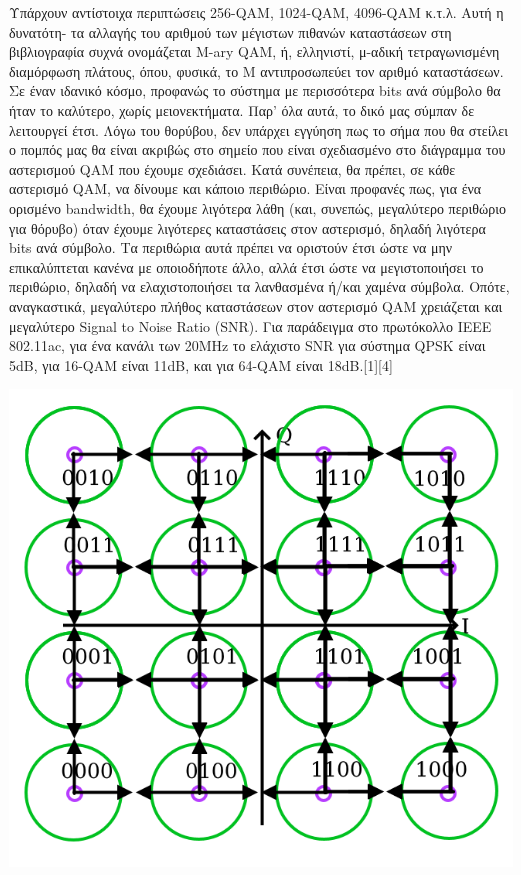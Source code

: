 \documentclass{article}
\begin{document}
Υπάρχουν αντίστοιχα περιπτώσεις 256-QAM, 1024-QAM, 4096-QAM κ.τ.λ. Αυτή η δυνατότη- τα αλλαγής του αριθμού των μέγιστων πιθανών καταστάσεων στη βιβλιογραφία συχνά ονομάζεται M-ary QAM, ή, ελληνιστί, μ-αδική τετραγωνισμένη διαμόρφωση πλάτους, όπου, φυσικά, το Μ αντιπροσωπεύει τον αριθμό καταστάσεων.\\[12pt]
Σε έναν ιδανικό κόσμο, προφανώς το σύστημα με περισσότερα bits ανά σύμβολο θα ήταν το καλύτερο, χωρίς μειονεκτήματα. Παρ' όλα αυτά, το δικό μας σύμπαν δε λειτουργεί έτσι. Λόγω του θορύβου, δεν υπάρχει εγγύηση πως το σήμα που θα στείλει ο πομπός μας θα είναι ακριβώς στο σημείο που είναι σχεδιασμένο στο διάγραμμα του αστερισμού QAM που έχουμε σχεδιάσει. Κατά συνέπεια, θα πρέπει, σε κάθε αστερισμό QAM, να δίνουμε και κάποιο περιθώριο. Είναι προφανές πως, για ένα ορισμένο bandwidth, θα έχουμε λιγότερα λάθη (και, συνεπώς, μεγαλύτερο περιθώριο για θόρυβο) όταν έχουμε λιγότερες καταστάσεις στον αστερισμό, δηλαδή λιγότερα bits ανά σύμβολο. Τα περιθώρια αυτά πρέπει να οριστούν έτσι ώστε να μην επικαλύπτεται κανένα με οποιοδήποτε άλλο, αλλά έτσι ώστε να μεγιστοποιήσει το περιθώριο, δηλαδή να ελαχιστοποιήσει τα λανθασμένα ή/και χαμένα σύμβολα. Οπότε, αναγκαστικά, μεγαλύτερο πλήθος καταστάσεων στον αστερισμό QAM χρειάζεται και μεγαλύτερο Signal to Noise Ratio (SNR). Για παράδειγμα στο πρωτόκολλο IEEE 802.11ac, για ένα κανάλι των 20MHz το ελάχιστο SNR για σύστημα QPSK είναι 5dB, για 16-QAM είναι 11dB, και για 64-QAM είναι 18dB.[1][4] 
\begin{center}
    \includegraphics[scale=0.5]{diktya_pic6.png}
\end{center}
\end{document}
